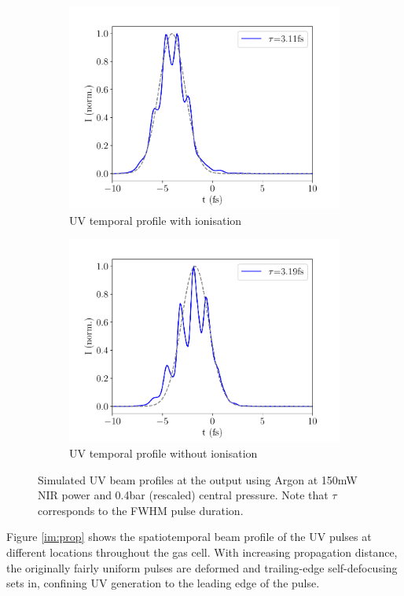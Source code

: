 \documentclass[a4paper]{jpconf}
\begin{document}
\begin{figure}[h]
\begin{subfigure}{0.49\textwidth}
        \includegraphics[width=\textwidth]{im/temporal_Ar_ion}
    \caption{UV temporal profile with ionisation}
    \end{subfigure}
    \begin{subfigure}{0.49\textwidth}
        \includegraphics[width=\textwidth]{im/temporal_Ar_no_ion}
    \caption{UV temporal profile without ionisation}
    \end{subfigure}  
\caption{Simulated UV beam profiles at the output using Argon at 150mW NIR power and 0.4bar (rescaled) central pressure. Note that $\tau$ corresponds to the FWHM pulse duration.}\label{im:profile_Ar}
\end{figure}
Figure \ref{im:prop} shows the spatiotemporal beam profile of the UV pulses at different locations throughout the gas cell. With increasing propagation distance, the originally fairly uniform pulses are deformed and trailing-edge self-defocusing sets in, confining UV generation to the leading edge of the pulse. 
\end{document}
